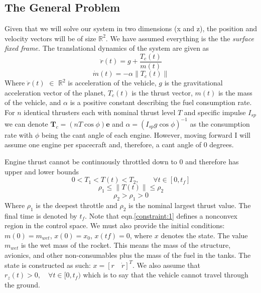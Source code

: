 \documentclass[journal]{new-aiaa}
\begin{document}
\begin{singlespace}
\section{The General Problem\citep{ploen2007}}
Given that we will solve our system in two dimensions (x and z), the position and velocity vectors will be of size $\mathbb{R}^2$. We have assumed everything is the the \textit{surface fixed frame.} The translational dynamics of the system are given as
\begin{equation}\label{dynamics1}
\ddot{r}(t)= g + \frac{ T_c (t)}{m(t)}
\end{equation}
\begin{equation}\label{dynamics2}
\dot{m}(t)=-\alpha \lVert T_c (t) \rVert
\end{equation}
Where $\ddot{r}(t)$ $\in$ $\mathbb{R}^2$ is acceleration of the vehicle, $g$ is the gravitational acceleration vector of the planet, $T_c (t)$ is the thrust vector, $m(t)$ is the mass of the vehicle, and $\alpha$ is a positive constant describing the fuel consumption rate. For $n$ identical thrusters each with nominal thrust level $T$ and specific impulse $I_{sp}$ we can denote $\boldsymbol T_c = (nT\cos\phi)\boldsymbol e$ and $\alpha = (I_{sp} g \cos\phi)^{-1}$ as the consumption rate with $\phi$ being the cant angle of each engine. However, moving forward I will assume one engine per spacecraft and, therefore, a cant angle of 0 degrees. 

Engine thrust cannot be continuously throttled down to 0 and therefore has upper and lower bounds 
\begin{equation}
0 < T_1 < T(t) < T_2, \qquad \forall t \in [0,t_f]
\end{equation}
\begin{equation} \label{constraint:1}
\rho_1 \leq \lVert T (t) \rVert \leq \rho_2
\end{equation}
\begin{equation}
\rho_2 > \rho_1 > 0
\end{equation}
Where $\rho_1$ is the deepest throttle and $\rho_2$ is the nominal largest thrust value. The final time is denoted by $t_f$. Note that eqn.\ref{constraint:1} defines a nonconvex region in the control space. We must also provide the initial conditions: $m(0) = m_{wet}$, $x(0) = x_0$, $x(tf) = 0$, where $x$ denotes the state. The value $m_{wet}$ is the wet mass of the rocket. This means the mass of the structure, avionics, and other non-consumables plus the mass of the fuel in the tanks.  The state is constructed as such: $x = [r \quad \dot{r}]^T$. We also assume that $r_z (t) > 0, \quad \forall t \in [0,t_f)$ which is to say that the vehicle cannot travel through the ground.


\end{singlespace}
\end{document}
